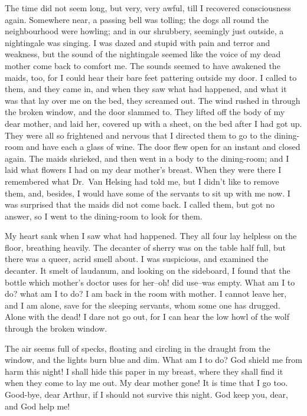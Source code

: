 \documentclass[12pt,openright]{book}
\begin{document}
The time did not seem long, but very, very awful, till I recovered consciousness again. Somewhere near, a passing bell was tolling; the dogs all round the neighbourhood were howling; and in our shrubbery, seemingly just outside, a nightingale was singing. I was dazed and stupid with pain and terror and weakness, but the sound of the nightingale seemed like the voice of my dead mother come back to comfort me. The sounds seemed to have awakened the maids, too, for I could hear their bare feet pattering outside my door. I called to them, and they came in, and when they saw what had happened, and what it was that lay over me on the bed, they screamed out. The wind rushed in through the broken window, and the door slammed to. They lifted off the body of my dear mother, and laid her, covered up with a sheet, on the bed after I had got up. They were all so frightened and nervous that I directed them to go to the dining-room and have each a glass of wine. The door flew open for an instant and closed again. The maids shrieked, and then went in a body to the dining-room; and I laid what flowers I had on my dear mother’s breast. When they were there I remembered what Dr. Van Helsing had told me, but I didn’t like to remove them, and, besides, I would have some of the servants to sit up with me now. I was surprised that the maids did not come back. I called them, but got no answer, so I went to the dining-room to look for them.

My heart sank when I saw what had happened. They all four lay helpless on the floor, breathing heavily. The decanter of sherry was on the table half full, but there was a queer, acrid smell about. I was suspicious, and examined the decanter. It smelt of laudanum, and looking on the sideboard, I found that the bottle which mother’s doctor uses for her–oh! did use–was empty. What am I to do? what am I to do? I am back in the room with mother. I cannot leave her, and I am alone, save for the sleeping servants, whom some one has drugged. Alone with the dead! I dare not go out, for I can hear the low howl of the wolf through the broken window.

The air seems full of specks, floating and circling in the draught from the window, and the lights burn blue and dim. What am I to do? God shield me from harm this night! I shall hide this paper in my breast, where they shall find it when they come to lay me out. My dear mother gone! It is time that I go too. Good-bye, dear Arthur, if I should not survive this night. God keep you, dear, and God help me!
\end{document}
